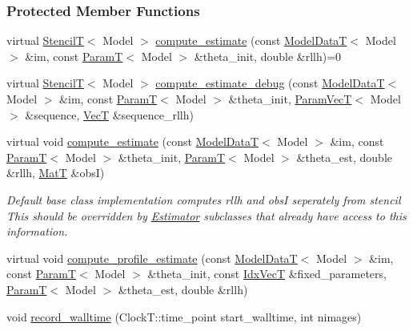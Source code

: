 \subsubsection*{Protected Member Functions}
\begin{DoxyCompactItemize}
\item 
virtual \hyperlink{namespacemappel_a3a06598240007876f8c4bf834ad86197}{StencilT}$<$ Model $>$ \hyperlink{classmappel_1_1Estimator_aa8b8c7f835056c94de1f21bff2ef205b}{compute\+\_\+estimate} (const \hyperlink{namespacemappel_a97f050df953605381ae9c901c3b125f1}{Model\+DataT}$<$ Model $>$ \&im, const \hyperlink{namespacemappel_a667925cb0d6c0e49f2f035cc5a9a6857}{ParamT}$<$ Model $>$ \&theta\+\_\+init, double \&rllh)=0
\item 
virtual \hyperlink{namespacemappel_a3a06598240007876f8c4bf834ad86197}{StencilT}$<$ Model $>$ \hyperlink{classmappel_1_1Estimator_a29c41d423941e8b86add3e493cb1375e}{compute\+\_\+estimate\+\_\+debug} (const \hyperlink{namespacemappel_a97f050df953605381ae9c901c3b125f1}{Model\+DataT}$<$ Model $>$ \&im, const \hyperlink{namespacemappel_a667925cb0d6c0e49f2f035cc5a9a6857}{ParamT}$<$ Model $>$ \&theta\+\_\+init, \hyperlink{namespacemappel_a0f86d3153e4e27b095012f140eea58de}{Param\+VecT}$<$ Model $>$ \&sequence, \hyperlink{namespacemappel_a2225ad69f358daa3f4f99282a35b9a3a}{VecT} \&sequence\+\_\+rllh)
\item 
virtual void \hyperlink{classmappel_1_1Estimator_aa46d86cfb5c336c9cb8c106da036d7d1}{compute\+\_\+estimate} (const \hyperlink{namespacemappel_a97f050df953605381ae9c901c3b125f1}{Model\+DataT}$<$ Model $>$ \&im, const \hyperlink{namespacemappel_a667925cb0d6c0e49f2f035cc5a9a6857}{ParamT}$<$ Model $>$ \&theta\+\_\+init, \hyperlink{namespacemappel_a667925cb0d6c0e49f2f035cc5a9a6857}{ParamT}$<$ Model $>$ \&theta\+\_\+est, double \&rllh, \hyperlink{namespacemappel_a7091ab87c528041f7e2027195fad8915}{MatT} \&obsI)
\begin{DoxyCompactList}\small\item\em Default base class implementation computes rllh and obsI seperately from stencil This should be overridden by \hyperlink{classmappel_1_1Estimator}{Estimator} subclasses that already have access to this information. \end{DoxyCompactList}\item 
virtual void \hyperlink{classmappel_1_1Estimator_a273f65624e06688cd4b1126e3e7556ae}{compute\+\_\+profile\+\_\+estimate} (const \hyperlink{namespacemappel_a97f050df953605381ae9c901c3b125f1}{Model\+DataT}$<$ Model $>$ \&im, const \hyperlink{namespacemappel_a667925cb0d6c0e49f2f035cc5a9a6857}{ParamT}$<$ Model $>$ \&theta\+\_\+init, const \hyperlink{namespacemappel_ac63743dcd42180127307cd0e4ecdd784}{Idx\+VecT} \&fixed\+\_\+parameters, \hyperlink{namespacemappel_a667925cb0d6c0e49f2f035cc5a9a6857}{ParamT}$<$ Model $>$ \&theta\+\_\+est, double \&rllh)
\item 
void \hyperlink{classmappel_1_1Estimator_a50125572d3b87ebcf1ffb27a8d8c643d}{record\+\_\+walltime} (Clock\+T\+::time\+\_\+point start\+\_\+walltime, int nimages)
\end{DoxyCompactItemize}
